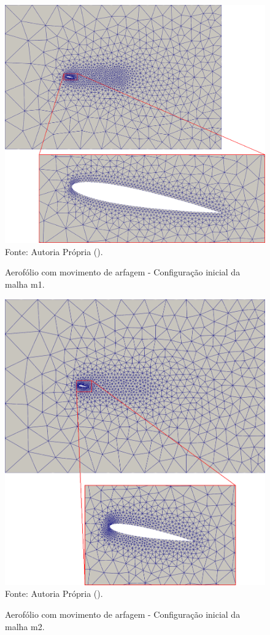 \begin{figure}[h!]
    \centering
    \caption{Aerofólio com movimento de arfagem - Configuração inicial da malha m1.}
    \includegraphics[width=.75\linewidth]{Figuras/rotating-airfoil/m1.png}
    \\Fonte: Autoria Própria (\the\year).
    \label{fig:rotating-airfoil-m1}
\end{figure}

\begin{figure}[h!]
    \centering
    \caption{Aerofólio com movimento de arfagem - Configuração inicial da malha m2.}
    \includegraphics[width=.75\linewidth]{Figuras/rotating-airfoil/m2.png}
    \\Fonte: Autoria Própria (\the\year).
    \label{fig:rotating-airfoil-m2}
\end{figure}

